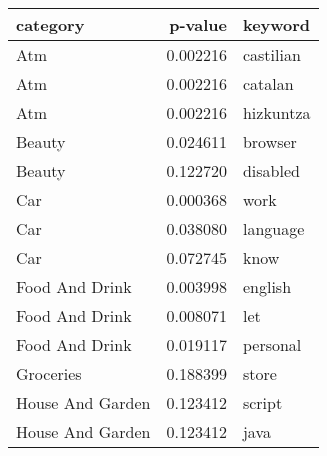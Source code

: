 \begin{tabular}{lrl}
\toprule
        category &  p-value &   keyword \\
\midrule
             Atm & 0.002216 & castilian \\
             Atm & 0.002216 &   catalan \\
             Atm & 0.002216 & hizkuntza \\
          Beauty & 0.024611 &   browser \\
          Beauty & 0.122720 &  disabled \\
             Car & 0.000368 &      work \\
             Car & 0.038080 &  language \\
             Car & 0.072745 &      know \\
  Food And Drink & 0.003998 &   english \\
  Food And Drink & 0.008071 &       let \\
  Food And Drink & 0.019117 &  personal \\
       Groceries & 0.188399 &     store \\
House And Garden & 0.123412 &    script \\
House And Garden & 0.123412 &      java \\
\bottomrule
\end{tabular}

